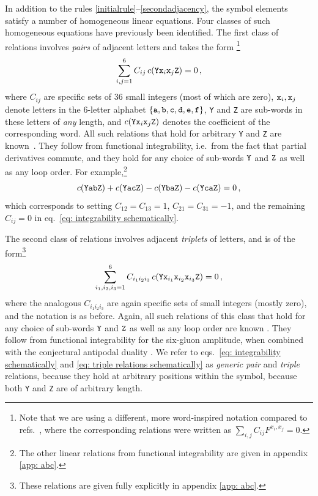 \documentclass[12pt]{article}
\begin{document}
In addition to the rules \ref{initialrule}--\ref{secondadjacency}, the symbol elements satisfy a number of homogeneous linear equations. Four classes of such homogeneous equations have previously been identified.
The first class of relations involves \emph{pairs} of adjacent letters and takes the form%
\footnote{Note that we are using a different, more word-inspired notation compared to refs.~\citep{Dixon:2022rse,Cai:2024znx}, where the corresponding relations were written as $\sum_{i,j}C_{ij} F^{x_i,x_j}=0$.}
\begin{equation}
\label{eq: integrability schematically}
    \sum_{i,j=1}^6 C_{ij} \, c({\tt Y}{\tt x}_i{\tt x}_j{\tt Z})=0\,,
\end{equation}
where $C_{ij}$ are specific sets of 36 small integers (most of which are zero), ${\tt x}_i,{\tt x}_j$ denote letters in the 6-letter alphabet $\{{\tt a},{\tt b},{\tt c},{\tt d},{\tt e},{\tt f}\}$, {\tt Y} and {\tt Z} are sub-words in these letters of \emph{any} length, and $c({\tt Yx}_i{\tt x}_j{\tt Z})$ denotes the coefficient of the corresponding word. 
All such relations that hold for arbitrary {\tt Y} and {\tt Z} are known~\citep{Dixon:2020bbt,Dixon:2022rse}. They follow from functional integrability, i.e.\ from the fact that partial derivatives commute, and they hold for any choice of sub-words ${\tt Y}$ and ${\tt Z}$ as well as any loop order. For example,\footnote{The other linear relations from functional integrability are given in appendix \ref{app: abc}.}
\begin{equation}
    c({\tt YabZ})+c({\tt YacZ})-c({\tt YbaZ})-c({\tt YcaZ}) =0\,,
\label{eq:intexample}
\end{equation}
which corresponds to setting $C_{12}=C_{13}=1$, $C_{21}=C_{31}=-1$, and the remaining $C_{ij}=0$ in eq.~\eqref{eq: integrability schematically}.

The second class of relations involves adjacent \emph{triplets} of letters, and is of the form\footnote{These relations are given fully explicitly in appendix \ref{app: abc}.} 
\begin{equation}
\label{eq: triple relations schematically}
    \sum_{i_1,i_2,i_3=1}^6 C_{i_1i_2i_3} \, c({\tt Y}{\tt x}_{i_1}{\tt x}_{i_2}{\tt x}_{i_3}{\tt Z})=0\,,
\end{equation}
where the analogous $C_{i_1i_2i_3}$ are again specific sets of small integers (mostly zero), and the notation is as before.
Again, all such relations of this class that hold for any choice of sub-words ${\tt Y}$ and ${\tt Z}$ as well as any loop order are known \citep{Dixon:2020bbt,Dixon:2022rse}. They follow from functional integrability for the six-gluon amplitude, when combined with the conjectural antipodal duality \citep{Dixon:2021tdw}. We refer to eqs.~\eqref{eq: integrability schematically} and \eqref{eq: triple relations schematically} as {\it generic pair} and {\it triple} relations, because they hold at arbitrary positions within the symbol, because both {\tt Y} and {\tt Z} are of arbitrary length.
\end{document}
